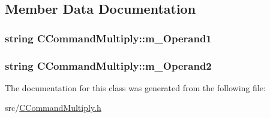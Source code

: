 \subsection{Member Data Documentation}
\subsubsection[{\texorpdfstring{m\+\_\+\+Operand1}{m_Operand1}}]{\setlength{\rightskip}{0pt plus 5cm}string C\+Command\+Multiply\+::m\+\_\+\+Operand1\hspace{0.3cm}{\ttfamily [private]}}\hypertarget{classCCommandMultiply_a41c3f181f0ee844a3afaba12a96c4502}{}\label{classCCommandMultiply_a41c3f181f0ee844a3afaba12a96c4502}
\subsubsection[{\texorpdfstring{m\+\_\+\+Operand2}{m_Operand2}}]{\setlength{\rightskip}{0pt plus 5cm}string C\+Command\+Multiply\+::m\+\_\+\+Operand2\hspace{0.3cm}{\ttfamily [private]}}\hypertarget{classCCommandMultiply_a213170d1398739645e55e5e841fff405}{}\label{classCCommandMultiply_a213170d1398739645e55e5e841fff405}


The documentation for this class was generated from the following file\+:\begin{DoxyCompactItemize}
\item 
src/\hyperlink{CCommandMultiply_8h}{C\+Command\+Multiply.\+h}\end{DoxyCompactItemize}

